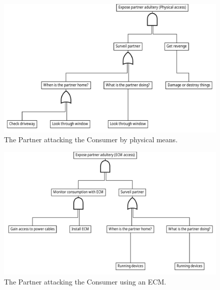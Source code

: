 \begin{figure}[h]
  \centering
  \includegraphics[width=\textwidth]{figures/graphviz/partner_vs_consumer_physical.pdf}
  \caption{The Partner attacking the Consumer by physical means.}
  \label{fig:attack_trees:partner:cheater_physical}
\end{figure}

\begin{figure}[h]
  \centering
  \includegraphics[width=\textwidth]{figures/graphviz/partner_vs_consumer_ecm.pdf}
  \caption{The Partner attacking the Consumer using an ECM.}
  \label{fig:attack_trees:partner:cheater_ecm}
\end{figure}


